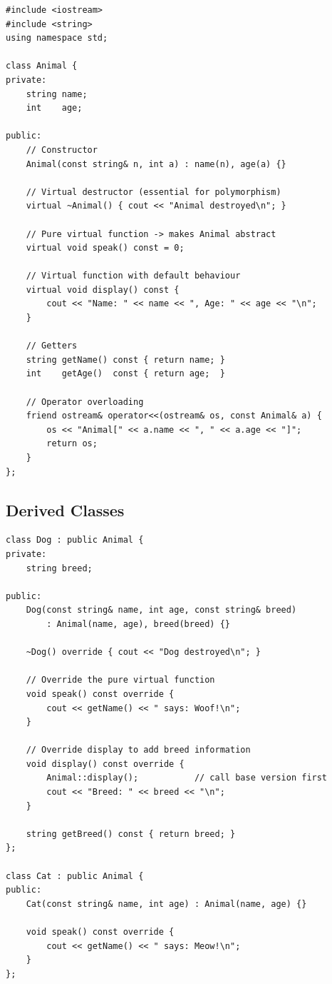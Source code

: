 \documentclass[11pt]{article}
\begin{document}
\begin{lstlisting}[caption={Base class definition and implementation}]
#include <iostream>
#include <string>
using namespace std;

class Animal {
private:
    string name;
    int    age;

public:
    // Constructor
    Animal(const string& n, int a) : name(n), age(a) {}

    // Virtual destructor (essential for polymorphism)
    virtual ~Animal() { cout << "Animal destroyed\n"; }

    // Pure virtual function -> makes Animal abstract
    virtual void speak() const = 0;

    // Virtual function with default behaviour
    virtual void display() const {
        cout << "Name: " << name << ", Age: " << age << "\n";
    }

    // Getters
    string getName() const { return name; }
    int    getAge()  const { return age;  }

    // Operator overloading
    friend ostream& operator<<(ostream& os, const Animal& a) {
        os << "Animal[" << a.name << ", " << a.age << "]";
        return os;
    }
};
\end{lstlisting}

\subsection{Derived Classes}

\begin{lstlisting}[caption={Derived class with overridden virtual functions}]
class Dog : public Animal {
private:
    string breed;

public:
    Dog(const string& name, int age, const string& breed)
        : Animal(name, age), breed(breed) {}

    ~Dog() override { cout << "Dog destroyed\n"; }

    // Override the pure virtual function
    void speak() const override {
        cout << getName() << " says: Woof!\n";
    }

    // Override display to add breed information
    void display() const override {
        Animal::display();           // call base version first
        cout << "Breed: " << breed << "\n";
    }

    string getBreed() const { return breed; }
};

class Cat : public Animal {
public:
    Cat(const string& name, int age) : Animal(name, age) {}

    void speak() const override {
        cout << getName() << " says: Meow!\n";
    }
};
\end{lstlisting}
\end{document}
